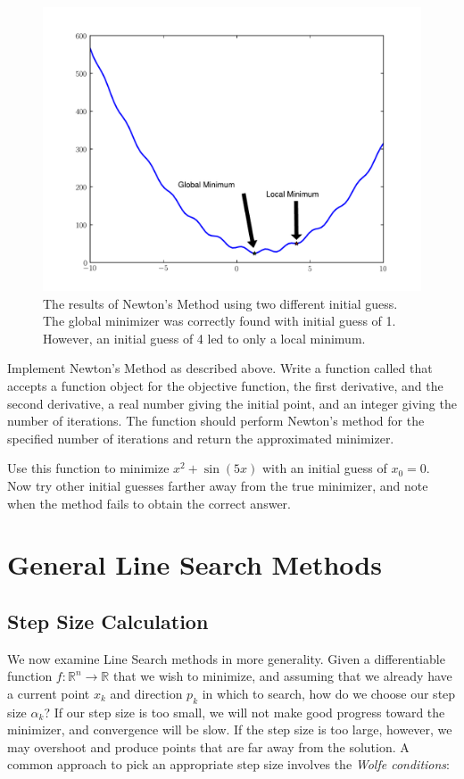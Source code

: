 \begin{figure}
\centering
\includegraphics[width=\textwidth]{newton.pdf}
\caption{The results of Newton's Method using two
different initial guess. The global minimizer was
correctly found with initial guess of 1. However,
an initial guess of 4 led to only a local minimum.}
\label{linesearch:newton}
\end{figure}

\begin{problem}
Implement Newton's Method as described above. Write a function called  that
accepts a function object for the objective function, the first derivative, and the
second derivative, a real number giving the initial point, and an integer giving the number
of iterations. The function should perform Newton's method for the specified number of iterations
and return the approximated minimizer.

Use this function to minimize $x^2 + \sin(5x)$ with an initial guess of $x_0 = 0$.
Now try other initial guesses farther away from the true minimizer, and note when the
method fails to obtain the correct answer.
\end{problem}

\section*{General Line Search Methods}
\subsection*{Step Size Calculation}
We now examine Line Search methods in more generality. Given a differentiable function
$f : \mathbb{R}^n \rightarrow \mathbb{R}$ that we wish to minimize, and assuming that
we already have a current point $x_k$ and direction $p_k$ in which to search, how do we
choose our step size $\alpha_k$? If our step size is too small, we will not make good progress
toward the minimizer, and convergence will be slow. If the step size is too large, however,
we may overshoot and produce points that are far away from the solution.
A common approach to pick an appropriate step size involves the \emph{Wolfe conditions}:


